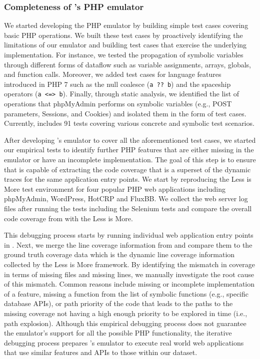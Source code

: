 \subsubsection{Completeness of \animatedead{}'s PHP emulator}
\label{sec:debugging}
We started developing the PHP emulator by building simple test cases covering basic PHP operations. 
We built these test cases by proactively identifying the limitations of our emulator and building test cases that exercise the underlying implementation. 
For instance, we tested the propagation of symbolic variables through different forms of dataflow such as variable assignments, arrays, globals, and function calls. 
Moreover, we added test cases for language features introduced in PHP 7 such as the null coalesce (\texttt{a ?? b}) and the spaceship operators (\texttt{a <=> b}). 
Finally, through static analysis, we identified the list of operations that phpMyAdmin performs on symbolic variables (e.g., POST parameters, Sessions, and Cookies) and isolated them in the form of test cases. 
Currently, \animatedead{} includes 91 tests covering various concrete and symbolic test scenarios. 

After developing \animatedead{}'s emulator to cover all the aforementioned test cases, we started our empirical tests to identify further PHP features that are either missing in the emulator or have an incomplete implementation. 
The goal of this step is to ensure that \animatedead{} is capable of extracting the code coverage that is a superset of the dynamic traces for the same application entry points. 
We start by reproducing the Less is More test environment for four popular PHP web applications including phpMyAdmin, WordPress, HotCRP and FluxBB. 
We collect the web server log files after running the tests including the Selenium tests and compare the overall code coverage from \animatedead{} with the Less is More. 

This debugging process starts by running individual web application entry points in \animatedead{}. 
Next, we merge the line coverage information from \animatedead{} and compare them to the ground truth coverage data which is the dynamic line coverage information collected by the Less is More framework. 
By identifying the mismatch in coverage in terms of missing files and missing lines, we manually investigate the root cause of this mismatch. 
Common reasons include missing or incomplete implementation of a feature, missing a function from the list of symbolic functions (e.g., specific database APIs), or path priority of the code that leads to the paths to the missing coverage not having a high enough priority to be explored in time (i.e., path explosion). 
Although this empirical debugging process does not guarantee the emulator's support for all the possible PHP functionality, the iterative debugging process prepares \animatedead{}'s emulator to execute real world web applications that use similar features and APIs to those within our dataset. 

